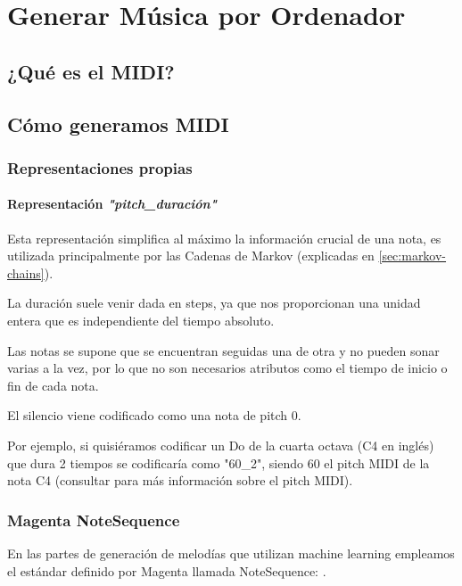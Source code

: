 \chapter{Generar Música por Ordenador}
\label{cap:generacionMusical}

\section{¿Qué es el MIDI?}

\section{Cómo generamos MIDI}
    \subsection{Representaciones propias}
        \subsubsection{Representación \textit{"pitch\_duración"}}
        \label{subsub:representacion-pitch_duracion}
        Esta representación simplifica al máximo la información crucial de una nota, es utilizada principalmente por las Cadenas de Markov (explicadas en \ref{sec:markov-chains}).

        La duración suele venir dada en steps, ya que nos proporcionan una unidad entera que es independiente del tiempo absoluto.

        Las notas se supone que se encuentran seguidas una de otra y no pueden sonar varias a la vez, por lo que no son necesarios atributos como el tiempo de inicio o fin de cada nota.

        El silencio viene codificado como una nota de pitch 0.

        Por ejemplo, si quisiéramos codificar un Do de la cuarta octava (C4 en inglés) que dura 2 tiempos se codificaría como "60\_2", siendo 60 el pitch MIDI de la nota C4 (consultar \cite{MIDIPitch} para más información sobre el pitch MIDI).

    \subsection{Magenta NoteSequence}
    \label{subsec:note-seq}
    En las partes de generación de melodías que utilizan machine learning empleamos el estándar definido por Magenta llamada NoteSequence: \cite{note-seq}. 

